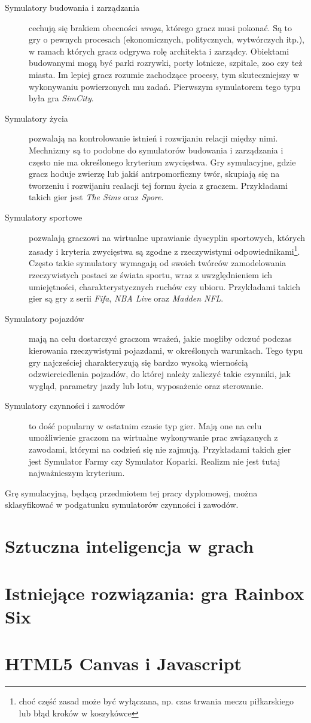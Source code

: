 \begin{description}
	\item[Symulatory budowania i zarządzania] cechują się brakiem obecności \emph{wroga}, którego gracz musi pokonać. Są to gry o pewnych procesach (ekonomicznych, politycznych, wytwórczych itp.), w ramach których gracz odgrywa rolę architekta i zarządcy. Obiektami budowanymi mogą być parki rozrywki, porty lotnicze, szpitale, zoo czy też miasta. Im lepiej gracz rozumie zachodzące procesy, tym skuteczniejszy w wykonywaniu powierzonych mu zadań. Pierwszym symulatorem tego typu była gra \emph{SimCity}.
	\item[Symulatory życia] pozwalają na kontrolowanie istnień i rozwijaniu relacji między nimi. Mechnizmy są to podobne do symulatorów budowania i zarządzania i często nie ma określonego kryterium zwycięstwa. Gry symulacyjne, gdzie gracz hoduje zwierzę lub jakiś antrpomorficzny twór, skupiają się na tworzeniu i rozwijaniu realacji tej formu życia z graczem. Przykładami takich gier jest \emph{The Sims} oraz \emph{Spore}.
	\item[Symulatory sportowe] pozwalają graczowi na wirtualne uprawianie dyscyplin sportowych, których zasady i kryteria zwycięstwa są zgodne z rzeczywistymi odpowiednikami\footnote{choć część zasad może być wyłączana, np. czas trwania meczu piłkarskiego lub błąd kroków w koszykówce}. Często takie symulatory wymagają od swoich twórców zamodelowania rzeczywistych postaci ze świata sportu, wraz z uwzględnieniem ich umiejętności, charakterystycznych ruchów czy ubioru. Przykładami takich gier są gry z serii \emph{Fifa}, \emph{NBA Live} oraz \emph{Madden NFL}.
	\item[Symulatory pojazdów] mają na celu dostarczyć graczom wrażeń, jakie mogliby odczuć podczas kierowania rzeczywistymi pojazdami, w określonych warunkach. Tego typu gry najcześciej charakteryzują się bardzo wysoką wiernością odzwierciedlenia pojzadów, do której należy zaliczyć takie czynniki, jak wygląd, parametry jazdy lub lotu, wyposażenie oraz sterowanie. 
	\item[Symulatory czynności i zawodów] to dość popularny w ostatnim czasie typ gier. Mają one na celu umożliwienie graczom na wirtualne wykonywanie prac związanych z zawodami, którymi na codzień się nie zajmują. Przykładami takich gier jest Symulator Farmy czy Symulator Koparki. Realizm nie jest tutaj najważnieszym kryterium.
\end{description}

Grę symulacyjną, będącą przedmiotem tej pracy dyplomowej, można sklasyfikować w podgatunku symulatorów czynności i zawodów.

\section{Sztuczna inteligencja w grach}
\section{Istniejące rozwiązania: gra Rainbox Six}
\section{HTML5 Canvas i Javascript}

